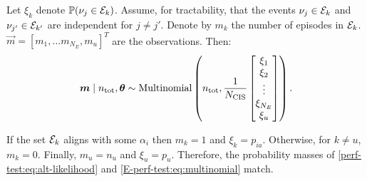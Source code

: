 \documentclass[thesis.tex]{subfiles}
\begin{document}
Let $\xi_k$ denote $\operatorname{\mathbb{P}}(\nu_j \in \mathcal{E}_k)$.
Assume, for tractability, that the events $\nu_j \in \mathcal{E}_k$ and $\nu_{j'} \in \mathcal{E}_{k'}$ are independent for $j \neq j'$.
Denote by $m_k$ the number of episodes in $\mathcal{E}_k$.
$\vec{m} = [m_1, \dots m_{N_E}, m_u]^T$ are the observations.
Then:
\begin{align}
  \bm{m}
  \mid n_\text{tot}, \bm{\theta}
  \sim
  \operatorname{Multinomial}\left(
    n_\text{tot},
    \frac{1}{N_\text{CIS}}
    \begin{bmatrix}
        \xi_1 \\ \xi_2 \\ \vdots \\ \xi_{N_E} \\ \xi_u
    \end{bmatrix}
  \right).
  \label{perf-test:eq:alt-likelihood}
\end{align}

If the set $\mathcal{E}_k$ aligns with some $\alpha_i$ then $m_k = 1$ and $\xi_k = p_{ia}$.
Otherwise, for $k \neq u$, $m_k = 0$.
Finally, $m_u = n_u$ and $\xi_u = p_u$.
Therefore, the probability masses of \cref{perf-test:eq:alt-likelihood} and \cref{E-perf-test:eq:multinomial} match.
\end{document}
